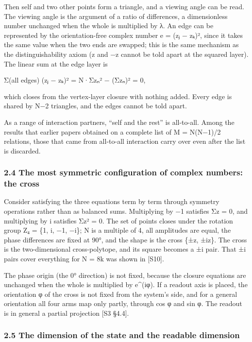 \documentclass[
  a4paper,
]{article}
\begin{document}
Then self and two other points form a triangle, and a viewing angle can
be read. The viewing angle is the argument of a ratio of differences, a
dimensionless number unchanged when the whole is multiplied by λ. An
edge can be represented by the orientation-free complex number e = (zⱼ −
zₖ)², since it takes the same value when the two ends are swapped; this
is the same mechanism as the distinguishability axiom (z and −z cannot
be told apart at the squared layer). The linear sum at the edge layer is

Σ(all edges) (zⱼ − zₖ)² = N·Σzₙ² − (Σzₙ)² = 0,

which closes from the vertex-layer closure with nothing added. Every
edge is shared by N−2 triangles, and the edges cannot be told apart.

As a range of interaction partners, ``self and the rest'' is all-to-all.
Among the results that earlier papers obtained on a complete list of M =
N(N−1)/2 relations, those that came from all-to-all interaction carry
over even after the list is discarded.

\subsubsection{2.4 The most symmetric configuration of complex numbers:
the
cross}\label{the-most-symmetric-configuration-of-complex-numbers-the-cross}

Consider satisfying the three equations term by term through symmetry
operations rather than as balanced sums. Multiplying by −1 satisfies Σz
= 0, and multiplying by i satisfies Σz² = 0. The set of points closes
under the rotation group Z₄ = \{1, i, −1, −i\}; N is a multiple of 4,
all amplitudes are equal, the phase differences are fixed at 90°, and
the shape is the cross \{±z, ±iz\}. The cross is the two-dimensional
cross-polytope, and its square becomes a ±i pair. That ±i pairs cover
everything for N = 8k was shown in {[}S10{]}.

The phase origin (the 0° direction) is not fixed, because the closure
equations are unchanged when the whole is multiplied by e\^{}(iφ). If a
readout axis is placed, the orientation φ of the cross is not fixed from
the system's side, and for a general orientation all four arms map only
partly, through cos φ and sin φ. The readout is in general a partial
projection {[}S3 §4.4{]}.

\subsubsection{2.5 The dimension of the state and the readable
dimension}\label{the-dimension-of-the-state-and-the-readable-dimension}
\end{document}
